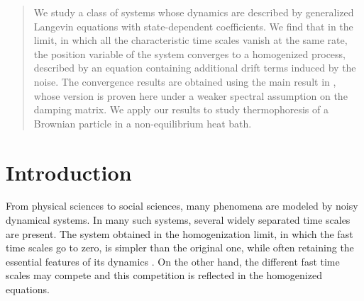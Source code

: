 \begin{abstract}
We study a class of systems whose dynamics are described by generalized Langevin equations with state-dependent coefficients. We find that in the limit, in which all the characteristic time scales  vanish at the same rate, the position variable of the system  converges to a homogenized process, described by an equation containing additional drift terms induced by the noise. The convergence results are obtained using the main result in \cite{hottovy2015smoluchowski}, whose version is proven here under a weaker spectral assumption on the damping matrix. We apply our  results to study thermophoresis of a Brownian particle in a non-equilibrium heat bath. 
\end{abstract}


\maketitle

\section{Introduction}



From physical sciences to social sciences, many phenomena are modeled by noisy dynamical systems. In many such systems, several widely separated time scales are present. The system obtained in the homogenization limit, in which the fast time scales go to zero, is simpler than the original one, while often retaining the essential features of its dynamics \cite{majda2001mathematical, givon2004extracting,Pavliotis-TwoFast,Pavliotis}. On the other hand, the different fast time scales may compete and this competition is reflected in the homogenized equations.

